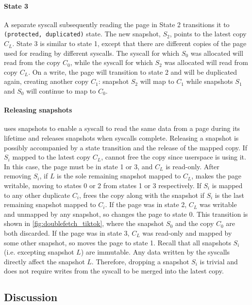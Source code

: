 \documentclass[letterpaper,twocolumn,10pt, anonymous]{article}
\begin{document}
\paragraph{State 3}
A separate syscall subsequently reading the page in State 2 transitions 
it to \texttt{(protected, duplicated)} state. 
The new snapshot, $S_2$, points to the latest copy $C_L$.
State 3 is similar to state 1, except that there are different copies of 
the page used for reading by different syscalls. 
The syscall for which $S_0$ was allocated will read from the copy $C_0$,
while the syscall for which $S_2$ was allocated will read from copy $C_L$.
On a write, the page will transition to state 2 and will be duplicated again,
creating another copy $C_1$: snapshot $S_2$ will map to $C_1$ while 
snapshots $S_1$ and $S_0$ will continue to map to $C_0$. 

\paragraph{Releasing snapshots}
\tiktok uses snapshots to enable a syscall to read the same data from a page 
during its lifetime and releases snapshots when syscalls complete. 
Releasing a snapshot is possibly accompanied by a state transition
and the release of the mapped copy.
If $S_i$ mapped to the latest copy $C_L$, \tiktok cannot free the copy
since userspace is using it.
In this case, the page must be in state 1 or 3, and $C_L$ is read-only.
After removing $S_i$, if $L$ is the sole remaining snapshot mapped to $C_L$, 
\tiktok makes the page writable, moving to states 0 or 2 from states 
1 or 3 respectively. 
If $S_i$ is mapped to any other duplicate $C_i$, \tiktok frees the copy along
with the snapshot if $S_i$ is the last remaining snapshot mapped to $C_i$.
If the page was in state 2, $C_L$ was writable and unmapped by any snapshot,
so \tiktok changes the page to state 0.
This transition is shown in \autoref{fig:doublefetch_tiktok}, where the 
snapshot $S_0$ and the copy $C_0$ are both discarded.
If the page was in state 3, $C_L$ was read-only and mapped by some other
snapshot, so \tiktok moves the page to state 1.
Recall that all snapshots $S_i$ (i.e. excepting snapshot $L$) are immutable.
Any data written by the syscalls directly affect the snapshot $L$. 
Therefore, dropping a snapshot $S_i$ is trivial and does not require 
writes from the syscall to be merged into the latest copy.

\subsection{Discussion}
\end{document}
